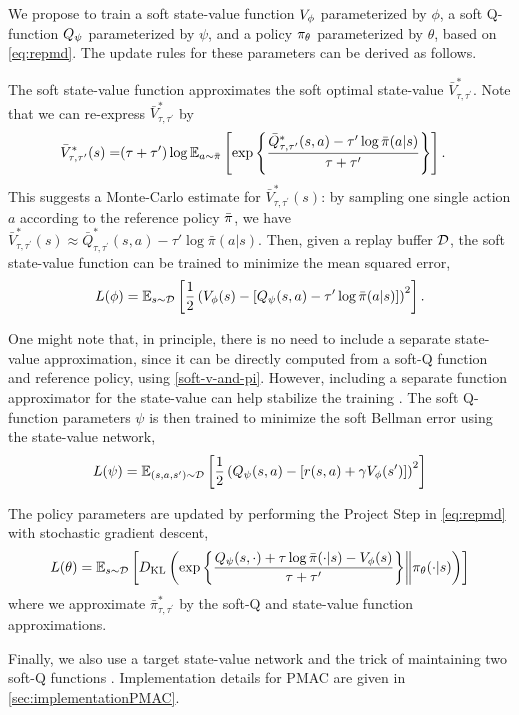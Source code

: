 We propose to train a
soft state-value function $V_{\phi}$ parameterized by $\phi$,
a soft Q-function $Q_{\psi}$ parameterized by $\psi$,
and a policy $\pi_{\theta}$ parameterized by $\theta$,
based on \cref{eq:repmd}.
The update rules for these parameters can be derived as follows.

The soft state-value function approximates the soft optimal state-value $\bar{V}_{\tau,\tau^{\prime}}^*$. Note that we can re-express $\bar{V}_{\tau,\tau^{\prime}}^*$ by 
\begin{align*}
\bar{V}_{\tau,\tau^{\prime}}^*(s) 
= & (\tau + \tau') \log \mathbb{E} _ {a\sim \bar{\pi}} \left[ \exp \left\{ \frac{\bar{Q}_{\tau,\tau^{\prime}}^*(s,a) - \tau' \log \bar{\pi}(a|s)} {\tau + \tau'} \right\} \right].
\end{align*}
This suggests a Monte-Carlo estimate for
$\bar{V}_{\tau,\tau^{\prime}}^*(s)$:
by sampling one single action $a$ according to the reference policy $\bar{\pi}$,
we have $\bar{V}_{\tau,\tau^{\prime}}^*(s)
 \approx  \bar{Q}_{\tau,\tau^{\prime}}^*(s,a) - \tau' \log \bar{\pi}(a|s) $.
Then,
given a replay buffer ${\mathcal{D}}$,
the soft state-value function can be trained to minimize
the mean squared error,
%
\begin{equation}
\label{eq:trainV}
L (\phi) = \mathbb{E}_{s\sim {\mathcal{D}}} \left[ \frac{1}{2} \left( V_{\phi}(s) -  \left[ Q_{\psi}(s,a ) - \tau' \log \bar{\pi}(a|s) \right] \right)^2 \right]
.
\end{equation}

One might note that, in principle, there is no need to include a 
separate state-value approximation, since it can be directly computed
from a soft-Q function and reference policy, 
using \cref{soft-v-and-pi}.
However, including a separate function approximator for the state-value
can help stabilize the training \citep{haarnoja2018soft}. 
The soft Q-function parameters $\psi$ is then trained to minimize the soft Bellman error using the state-value network,
\begin{equation}
\label{eq:trainQ}
L(\psi) = \mathbb{E}_{(s,a,s') \sim {\mathcal{D}}} \left[ \frac{1}{2} \left( Q_{\psi}(s,a) - \left[r(s,a) + \gamma V_{\phi}(s') \right] \right)^2 \right]
\end{equation}

The policy parameters are updated by performing the Project Step in
\cref{eq:repmd} with stochastic gradient descent,
%
\begin{equation}
\label{eq:trainpi}
L(\theta) = \mathbb{E}_{s \sim {\mathcal{D}}} \left[ D_{\mathrm{KL}} \left( \exp\left\{ \frac{Q_{\psi}(s,\cdot) + \tau \log \bar{\pi}(\cdot|s) - V_{\phi}(s)}{\tau+\tau'} \right\} \middle\Vert \pi_{\theta}(\cdot |s) \right) \right]
\end{equation}
%
where we approximate $\bar{\pi}_{\tau,\tau^{\prime}}^*$ by the soft-Q and state-value function approximations. 

Finally,
we also use a target state-value network \citep{lillicrap2015continuous}
and the trick of maintaining two soft-Q functions
\citep{haarnoja2018soft,fujimoto2018addressing}.
Implementation details for PMAC are given in \cref{sec:implementationPMAC}. 


